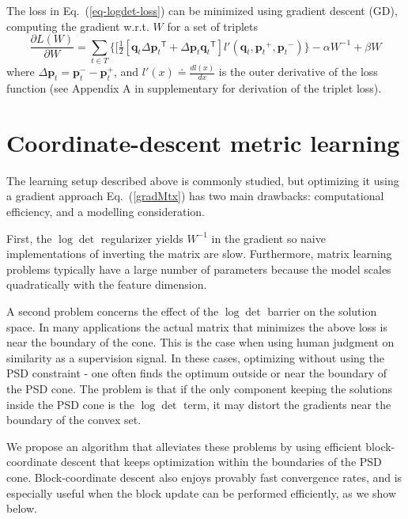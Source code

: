 \documentclass{article} %
\newcommand\mat[1]{{#1}}
\renewcommand\vec[1]{\mathbf{#1}}
\newcommand{\T}{{}^\mathsf{T}}
\newcommand{\W}{\mat{W}}
\newcommand{\eqdef}{\doteq}
\newcommand{\q}{{\vec{q}}}
\newcommand{\p}{{\vec{p}}}
\newcommand{\trip}{{t}}
\newcommand{\qt}{{\q_{\trip}}}
\newcommand{\pt}{{\p_{\trip}}}
\newcommand{\triplet}{(\qt, \pt^{+}, \pt^{-})}
\renewcommand{\eqref}[1]{Eq.~(\ref{#1})}
\begin{document}
The loss in \eqref{eq-logdet-loss} can be minimized using gradient descent (GD), computing the gradient w.r.t. $\W$ for a set of triplets
\begin{equation}
  \frac{\partial {L (\W)}}{\partial \W} = \sum\limits_{t\in T}{\{
  [\tfrac{1}{2}[\q_{t}\Delta\p_{t}\T + \Delta\p_{t}\q_{t}\T]  }
  {l'}\triplet\} - \alpha \W^{-1} + \beta \W
  \label{gradMtx}
\end{equation}
where $\Delta\p_t = \p_t^- - \p_t^+$, and $l'(x) \eqdef \frac{d{l(x)}}{dx}$ is the outer derivative of the loss function (see Appendix A in supplementary for derivation of the triplet loss). 


\section{Coordinate-descent metric learning}

The learning setup described above is commonly studied, but 
optimizing it using a gradient approach \eqref{gradMtx} has two main drawbacks: computational efficiency, and a modelling consideration.

First, the $\log \det$ regularizer yields $\W^{-1}$ in the gradient so naive implementations of inverting the matrix are slow. Furthermore, matrix learning problems typically have a large number of parameters because the model scales quadratically with the feature dimension. %


A second problem concerns the effect of the $\log \det$ barrier on the solution space. In many applications the actual matrix that minimizes the above loss is near the boundary of the cone. This is the case when using human judgment on similarity as a supervision signal. In these cases, optimizing without using the PSD constraint - one often finds the optimum outside or near the boundary of the PSD cone.
The problem is that if the only component keeping the solutions inside the PSD cone is the $\log \det$ term, it may distort the gradients near the boundary of the convex set. 

We propose an algorithm that alleviates these problems by using efficient block-coordinate descent that keeps optimization within the boundaries of the PSD cone.
Block-coordinate descent also enjoys provably fast convergence rates, and is especially useful when the block update can be performed efficiently, as we show below.
\end{document}
